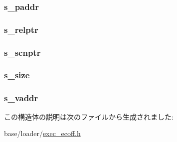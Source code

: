 \label{structecoff__scnhdr_a55e39a8787cbb4e607f56abcc84c53d5}
\hypertarget{structecoff__scnhdr_ab14630f315eafd79c3aa3f0562acc63d}{
\subsubsection[{s\_\-paddr}]{ {\bf s\_\-paddr}}}
\label{structecoff__scnhdr_ab14630f315eafd79c3aa3f0562acc63d}
\hypertarget{structecoff__scnhdr_afc5396a9c8f0c041cc8d52cd3583f319}{
\subsubsection[{s\_\-relptr}]{ {\bf s\_\-relptr}}}
\label{structecoff__scnhdr_afc5396a9c8f0c041cc8d52cd3583f319}
\hypertarget{structecoff__scnhdr_a09d545c338b37a99ca276eab7a5c91a9}{
\subsubsection[{s\_\-scnptr}]{ {\bf s\_\-scnptr}}}
\label{structecoff__scnhdr_a09d545c338b37a99ca276eab7a5c91a9}
\hypertarget{structecoff__scnhdr_af08bd0d7cade9682d92a3d1be210797c}{
\subsubsection[{s\_\-size}]{ {\bf s\_\-size}}}
\label{structecoff__scnhdr_af08bd0d7cade9682d92a3d1be210797c}
\hypertarget{structecoff__scnhdr_a54c259d6d87d6926066f269c3c82c71c}{
\subsubsection[{s\_\-vaddr}]{ {\bf s\_\-vaddr}}}
\label{structecoff__scnhdr_a54c259d6d87d6926066f269c3c82c71c}


この構造体の説明は次のファイルから生成されました:\begin{DoxyCompactItemize}
\item 
base/loader/\hyperlink{exec__ecoff_8h}{exec\_\-ecoff.h}\end{DoxyCompactItemize}
